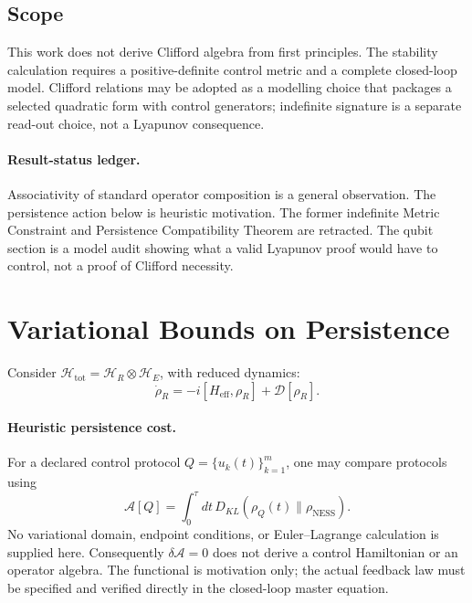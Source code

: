 \documentclass[12pt,a4paper,openany]{book}
\begin{document}
\subsection{Scope}

This work does not derive Clifford algebra from first principles.  The stability calculation requires a positive-definite control metric and a complete closed-loop model.  Clifford relations may be adopted as a modelling choice that packages a selected quadratic form with control generators; indefinite signature is a separate read-out choice, not a Lyapunov consequence.

\paragraph{Result-status ledger.}
Associativity of standard operator composition is a general observation.  The persistence action below is heuristic motivation.  The former indefinite Metric Constraint and Persistence Compatibility Theorem are retracted.  The qubit section is a model audit showing what a valid Lyapunov proof would have to control, not a proof of Clifford necessity.

\section{Variational Bounds on Persistence}
\label{B-sec:variational}

Consider $\mathcal{H}_{\mathrm{tot}} = \mathcal{H}_R \otimes \mathcal{H}_E$, with reduced dynamics:
\begin{equation}
\dot{\rho}_R = -i[H_{\mathrm{eff}}, \rho_R] + \mathcal{D}[\rho_R].
\end{equation}

\paragraph{Heuristic persistence cost.}
For a declared control protocol $Q=\{u_k(t)\}_{k=1}^m$, one may compare protocols using
\begin{equation}
\mathcal{A}[Q] = \int_0^\tau dt\, D_{KL}(\rho_Q(t) \| \rho_{\mathrm{NESS}}).
\end{equation}
No variational domain, endpoint conditions, or Euler--Lagrange calculation is supplied here.  Consequently $\delta\mathcal A=0$ does not derive a control Hamiltonian or an operator algebra.  The functional is motivation only; the actual feedback law must be specified and verified directly in the closed-loop master equation.
\end{document}
